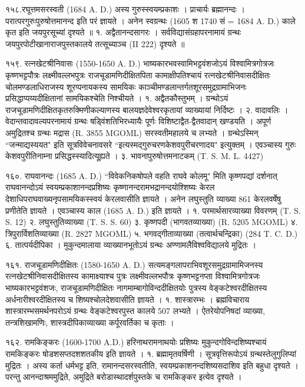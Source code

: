 १५८.रघूत्तमसरस्वती (1684 A. D.)
अस्य गुरुस्स्वयम्प्रकाशः । प्राचार्यः ब्रह्मानन्दः । परात्परगुरुःपुरुषोत्तमानन्द इति परं ज्ञायते । अनेन स्वग्रन्थः (1605 श 1740 सं = 1684 A. D.) काले कृत इति जयपुरसूच्यां दृश्यते ॥
१. अद्वैतानन्दसागरः । सर्वविद्यासंग्रहापरनामायं ग्रन्थः जयपुरपोटीखानाराजपुस्तकालये तत्सूच्याञ्च (II 222) दृश्यते ॥

१५९. रत्नखेटश्रीनिवासः (1550-1650 A. D.)
भाष्यकारभवस्वामिभट्टवंशजोऽयं विश्वामित्रगोत्रजः कृष्णभट्टपौत्रः लक्ष्मीवल्लभपुत्रः राजचूडामणिदीक्षितपिता कामाक्षीपतिश्चायं रत्नखेटश्रीनिवासदीक्षितः चोलमण्डलाधिराजस्य शूरप्पनायकस्य सामयिकः काञ्चीमण्डलान्तर्गतशूरसमुद्रग्रामाभिजनः प्रसिद्धाप्पय्यदीक्षितानां सामयिकश्चेति निश्चीयते ।
१. अद्वैतकौस्तुभम् । ग्रन्थोऽयं राजचूडामणिदीक्षितकृतरुक्मिणीकल्याणस्य बालयज्ञदेवेश्वरकृतायां व्याख्यायां निर्दिष्टः ।
२. वादावलिः । वेदान्तवादावल्यपरनामायं ग्रन्थः षड्विंशतिभिरध्यायैः पूर्णः विशिष्टाद्वैत-द्वैतवादान् खण्डयति । अपूर्ण अमुद्रितश्च ग्रन्थः मद्रास (R. 3855 MGOML) सरस्वतीमहालये च लभ्यते । ग्रन्थेऽस्मिन् ``जन्माद्यस्ययत" इति सूत्रविवेचनावसरे ``इत्यस्मद्गुरुचरणकेशवपुरीचरणादय" इत्युक्तम् । एवञ्चास्य गुरुः केशवपुरीतिनाम्ना प्रसिद्धस्स्यादित्यू्ह्यते ।
३. भावनापुरुषोत्तमनाटकम् (T. S. M. L. 4427)

१६०. राघवानन्दः (1685 A. D.)
``विवेकनिकषोपले वहति राघवे कोलमू" मिति कृष्णपद्यां दर्शनात् राघवानन्दोऽयं स्वयम्प्रकाशानन्दप्रशिष्यः कृष्णानन्दरामभद्रानन्दयोश्शिष्यः केरल देशाधिपराघवाख्यनृपसामयिकस्स्वयं केरलवासीति ज्ञायते । अनेन लघुस्तुति व्याख्या 861 केरलवर्षेषु प्रणीतेति ज्ञायते । एवञ्चास्य काल (1685 A. D.) इति ज्ञायते ।
१. परमार्थसारव्याख्या विवरणम् (T. S. S. 12)
२. लघुस्तुतिव्याख्या (T. S. S. 60)
३. कृष्णपदी (भागवतव्याख्या) (R. 5205 MGOML)
४. त्रिपुरार्विशतिव्याख्या (R. 2827 MGOML)
५. भगवद्गीताव्याख्या (तत्वार्थचन्द्रिका) (284 T. C. D.)
६. तात्पर्यदीपिका । मुकुन्दमालाया व्याख्यानभूतोऽयं ग्रन्थः अण्णामलैविश्वविद्यालये मुद्रितः ।

१६१. राजचूडामणिदीक्षितः (1580-1650 A. D.)
सत्यमङ्गलापराभिवशूरसमुद्रग्रामामिजनस्य रत्नखेटश्रीनिवासदीक्षितस्य कामाक्ष्याश्च पुत्रः लक्ष्मीवल्लभपौत्रः कृष्णभट्टनप्ता विश्वामित्रगोत्रजः भाष्यकारभट्टवंशजः, राजचूडामणिदीक्षितः नागमाम्बागोविन्ददीक्षितयोः पुत्रस्य वेङ्कटेश्वरदीक्षितस्य अर्धनारीश्वरदीक्षितस्य च शिष्यश्चोलदेशवासीति ज्ञायते ।
१. शास्त्रारम्भः । ब्रह्मविचाराय शास्त्रारम्भसमर्थनपरोऽयं ग्रन्थः वेङ्कटेश्वरपुस्त कालये 507 लभ्यते ।
ऐतरेयोपनिषदां व्याख्या, तन्त्रशिखामणिः, शास्त्रदीपिकाव्याख्या कर्पूरवर्तिका च कृताः ।

१६२. रामकिङ्करः (1600-1700 A.D.)
हरिनाथरामनाथयोः प्रशिष्यः मुकुन्दगोविन्दशिष्यश्चायं रामकिङ्करः षोडशसप्तदशशतकीय इति ज्ञायते ।
१. ब्रह्मामृतवर्षिणी । सूत्रवृत्तिरूपोऽयं ग्रन्थस्तेलुगुलिप्यां मुद्रितः । अस्य कर्ता धर्मभट्ट इति, रामानन्दसरस्वतीति, स्वयम्प्रकाशनन्दशिष्यसदाशिव इति बहुधा दृश्यते । परन्तु आनन्दाश्रममुद्रिते, अमुद्रिते बरोडास्थादर्शपुस्तके च रामकिङ्कर इत्येव दृश्यते ।

